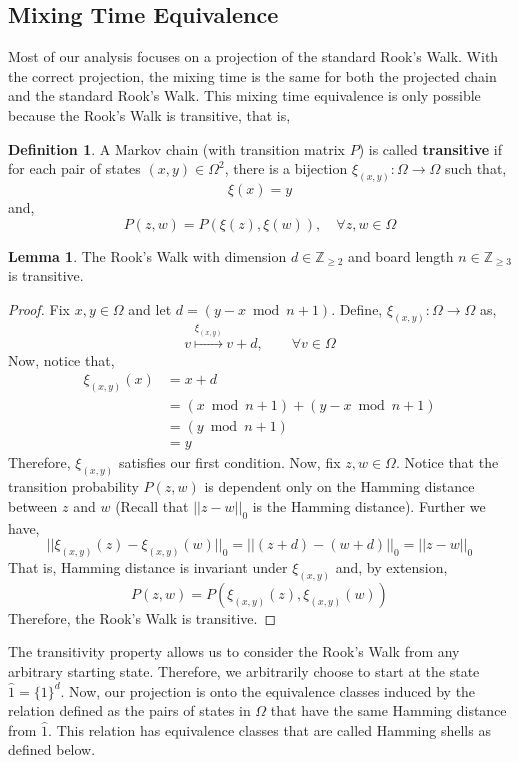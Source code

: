 \documentclass{article}
\theoremstyle{definition}
\newtheorem{definition}{Definition}
\theoremstyle{definition}
\theoremstyle{definition}
\newtheorem{lemma}{Lemma}
\theoremstyle{definition}
\theoremstyle{named}
\begin{document}
\subsection{Mixing Time Equivalence}
Most of our analysis focuses on a projection of the standard Rook's Walk. With the correct projection, the mixing time is the same for both the projected chain and the standard Rook's Walk. This mixing time equivalence is only possible because the Rook's Walk is transitive, that is,
\begin{definition}
   \label{transitivity_def}
A Markov chain (with transition matrix $P$) is called {\bf transitive} if for each pair of states $(x,y)\in \Omega^2$, there is a bijection $\xi_{(x,y)}: \Omega\to \Omega$ such that,
\[\xi(x) = y\]
and,
\[P(z,w)=P(\xi(z),\xi(w)),\quad \forall z,w\in \Omega\]
\end{definition}
\begin{lemma}
   \label{transitivity}
  The Rook's Walk with dimension $d\in \mathbb{Z}_{\geq 2}$ and board length $n\in \mathbb{Z}_{\geq 3}$ is transitive.
  \begin{proof}
  Fix $x,y\in \Omega$ and let $d = (y-x \bmod n+1)$. Define, $\xi_{(x,y)}: \Omega \to \Omega$ as,
  \[v \overset{\xi_{(x,y)}}{\longmapsto} v + d,\quad  \quad \forall v\in \Omega\]
  Now, notice that,
  \begin{align*}
   \xi_{(x,y)}(x) &= x + d\\
   &= (x\bmod n+1) + (y-x \bmod n+1)\\
   &= (y\bmod n+1)\\
   &= y
  \end{align*}
  Therefore, $\xi_{(x,y)}$ satisfies our first condition. Now, fix $z,w \in \Omega$. Notice that the transition probability $P(z,w)$ is dependent only on the Hamming distance between $z$ and $w$ (Recall that $||z-w||_0$ is the Hamming distance). Further we have,
  \[||\xi_{(x,y)}(z) - \xi_{(x,y)}(w)||_0 = ||(z+d)-(w+d)||_0= ||z-w||_0\]
  That is, Hamming distance is invariant under $\xi_{(x,y)}$ and, by extension, \[P(z,w) = P(\xi_{(x,y)}(z), \xi_{(x,y)}(w))\]
  Therefore, the Rook's Walk is transitive.
  \end{proof}
\end{lemma}
\noindent The transitivity property allows us to consider the Rook's Walk from any arbitrary starting state. Therefore, we arbitrarily choose to start at the state $\hat{1}=\{1\}^d$. Now, our projection is onto the equivalence classes induced by the relation defined as the pairs of states in $\Omega$ that have the same Hamming distance from $\hat{1}$. This relation has equivalence classes that are called Hamming shells as defined below. 
\end{document}
